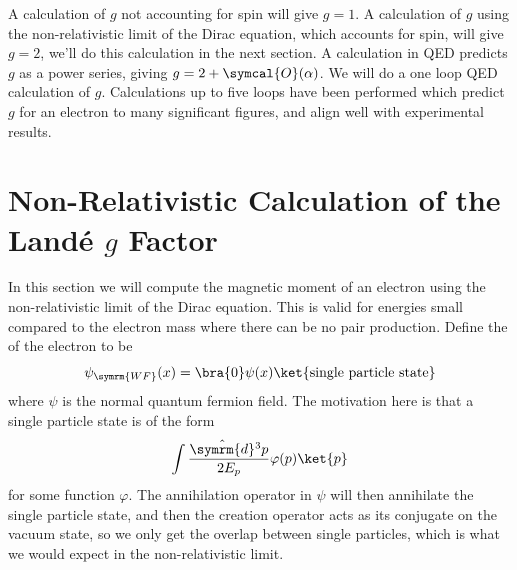 \documentclass[fleqn]{NotesClass}
\newcommand{\dhat}[1]{\hat{\symrm{d}}{#1}}
\newcommand{\order}{\symcal{O}}
\begin{document}
    A calculation of \(g\) not accounting for spin will give \(g = 1\).
    A calculation of \(g\) using the non-relativistic limit of the Dirac equation, which accounts for spin, will give \(g = 2\), we'll do this calculation in the next section.
    A calculation in QED predicts \(g\) as a power series, giving \(g = 2 + \order(\alpha)\).
    We will do a one loop QED calculation of \(g\).
    Calculations up to five loops have been performed which predict \(g\) for an electron to many significant figures, and align well with experimental results.
    
    \section{Non-Relativistic Calculation of the Land\'e \texorpdfstring{\(g\)}{g} Factor}
    In this section we will compute the magnetic moment of an electron using the non-relativistic limit of the Dirac equation.
    This is valid for energies small compared to the electron mass where there can be no pair production.
    Define the  of the electron to be
    \begin{equation}
        \psi_{\symrm{WF}}(x) = \bra{0} \psi(x) \ket{\text{single particle state}}
    \end{equation}
    where \(\psi\) is the normal quantum fermion field.
    The motivation here is that a single particle state is of the form
    \begin{equation}
        \int \frac{\dhat{^3p}}{2E_p} \varphi(p) \ket{p}
    \end{equation}
    for some function \(\varphi\).
    The annihilation operator in \(\psi\) will then annihilate the single particle state, and then the creation operator acts as its conjugate on the vacuum state, so we only get the overlap between single particles, which is what we would expect in the non-relativistic limit.
    
\end{document}
